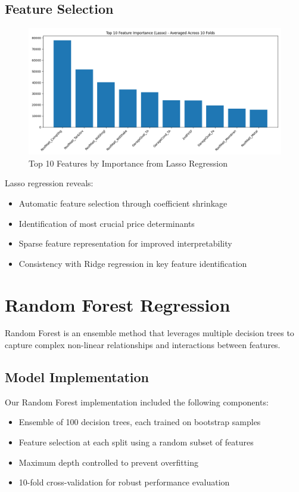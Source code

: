\documentclass[12pt]{report}
\begin{document}
\subsection{Feature Selection}
\begin{figure}[H]
    \centering
    \includegraphics[width=1.0\textwidth]{figures/lasso_feature_importance.png}
    \caption{Top 10 Features by Importance from Lasso Regression}
    \label{fig:lasso_importance}
\end{figure}

Lasso regression reveals:
\begin{itemize}
    \item Automatic feature selection through coefficient shrinkage
    \item Identification of most crucial price determinants
    \item Sparse feature representation for improved interpretability
    \item Consistency with Ridge regression in key feature identification
\end{itemize}

\section{Random Forest Regression}
Random Forest is an ensemble method that leverages multiple decision trees to capture complex non-linear relationships and interactions between features.

\subsection{Model Implementation}
Our Random Forest implementation included the following components:
\begin{itemize}
    \item Ensemble of 100 decision trees, each trained on bootstrap samples
    \item Feature selection at each split using a random subset of features
    \item Maximum depth controlled to prevent overfitting
    \item 10-fold cross-validation for robust performance evaluation
\end{itemize}
\end{document}
